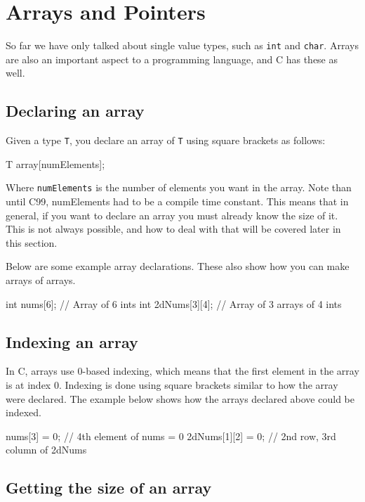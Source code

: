 
\chapter{Arrays and Pointers}

So far we have only talked about single value types, such as \texttt{int} and \texttt{char}.
Arrays are also an important aspect to a programming language, and C has these as well.

\section{Declaring an array}

Given a type \texttt{T}, you declare an array of \texttt{T} using square brackets as follows:

\begin{codeinline}
T array[numElements];
\end{codeinline}

Where \texttt{numElements} is the number of elements you want in the array.
Note than until C99, numElements had to be a compile time constant.
This means that in general, if you want to declare an array you must already know the size of it.
This is not always possible, and how to deal with that will be covered later in this section.

Below are some example array declarations.
These also show how you can make arrays of arrays.

\begin{codeblock}
int nums[6]; // Array of 6 ints
int 2dNums[3][4]; // Array of 3 arrays of 4 ints
\end{codeblock}

\section{Indexing an array}

In C, arrays use 0-based indexing, which means that the first element in the array is at index 0.
Indexing is done using square brackets similar to how the array were declared.
The example below shows how the arrays declared above could be indexed.

\begin{codeblock}
nums[3] = 0; // 4th element of nums = 0
2dNums[1][2] = 0; // 2nd row, 3rd column of 2dNums
\end{codeblock}

\section{Getting the size of an array}

